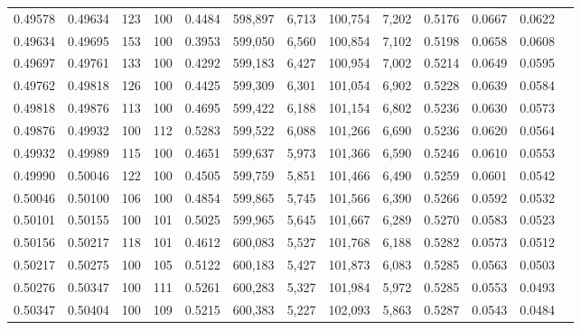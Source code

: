 \begin{tabular}{rrrrrrrrrrrrr}
0.49578 & 0.49634 &   123 & 100 &                                     0.4484 & 598,897 &   6,713 & 100,754 &   7,202 & 0.5176 & 0.0667 & 0.0622 \\
0.49634 & 0.49695 &   153 & 100 &                                     0.3953 & 599,050 &   6,560 & 100,854 &   7,102 & 0.5198 & 0.0658 & 0.0608 \\
0.49697 & 0.49761 &   133 & 100 &                                     0.4292 & 599,183 &   6,427 & 100,954 &   7,002 & 0.5214 & 0.0649 & 0.0595 \\
0.49762 & 0.49818 &   126 & 100 &                                     0.4425 & 599,309 &   6,301 & 101,054 &   6,902 & 0.5228 & 0.0639 & 0.0584 \\
0.49818 & 0.49876 &   113 & 100 &                                     0.4695 & 599,422 &   6,188 & 101,154 &   6,802 & 0.5236 & 0.0630 & 0.0573 \\
0.49876 & 0.49932 &   100 & 112 &                                     0.5283 & 599,522 &   6,088 & 101,266 &   6,690 & 0.5236 & 0.0620 & 0.0564 \\
0.49932 & 0.49989 &   115 & 100 &                                     0.4651 & 599,637 &   5,973 & 101,366 &   6,590 & 0.5246 & 0.0610 & 0.0553 \\
0.49990 & 0.50046 &   122 & 100 &                                     0.4505 & 599,759 &   5,851 & 101,466 &   6,490 & 0.5259 & 0.0601 & 0.0542 \\
0.50046 & 0.50100 &   106 & 100 &                                     0.4854 & 599,865 &   5,745 & 101,566 &   6,390 & 0.5266 & 0.0592 & 0.0532 \\
0.50101 & 0.50155 &   100 & 101 &                                     0.5025 & 599,965 &   5,645 & 101,667 &   6,289 & 0.5270 & 0.0583 & 0.0523 \\
0.50156 & 0.50217 &   118 & 101 &                                     0.4612 & 600,083 &   5,527 & 101,768 &   6,188 & 0.5282 & 0.0573 & 0.0512 \\
0.50217 & 0.50275 &   100 & 105 &                                     0.5122 & 600,183 &   5,427 & 101,873 &   6,083 & 0.5285 & 0.0563 & 0.0503 \\
0.50276 & 0.50347 &   100 & 111 &                                     0.5261 & 600,283 &   5,327 & 101,984 &   5,972 & 0.5285 & 0.0553 & 0.0493 \\
0.50347 & 0.50404 &   100 & 109 &                                     0.5215 & 600,383 &   5,227 & 102,093 &   5,863 & 0.5287 & 0.0543 & 0.0484 \\

\end{tabular}
